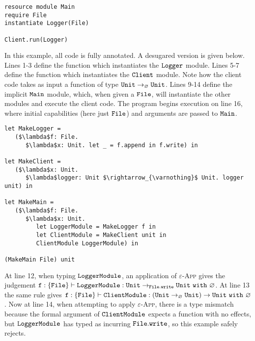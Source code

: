 \begin{lstlisting}
resource module Main
require File
instantiate Logger(File)

Client.run(Logger)
\end{lstlisting}

In this example, all code is fully annotated. A desugared version is given below. Lines 1-3 define the function which instantiates the $\mathtt{Logger}$ module. Lines 5-7 define the function which instantiates the $\mathtt{Client}$ module. Note how the client code takes as input a function of type $\mathtt{Unit} \rightarrow_{\varnothing} \mathtt{Unit}$. Lines 9-14 define the implicit $\mathtt{Main}$ module, which, when given a $\mathtt{File}$, will instantiate the other modules and execute the client code. The program begins execution on line 16, where initial capabilities (here just $\mathtt{File}$) and arguments are passed to $\mathtt{Main}$.

\begin{lstlisting}
let MakeLogger =
   ($\lambda$f: File.
      $\lambda$x: Unit. let _ = f.append in f.write) in
           
let MakeClient =
   ($\lambda$x: Unit.
      $\lambda$logger: Unit $\rightarrow_{\varnothing}$ Unit. logger unit) in
                  
let MakeMain =
   ($\lambda$f: File.
      $\lambda$x: Unit.
         let LoggerModule = MakeLogger f in
         let ClientModule = MakeClient unit in
         ClientModule LoggerModule) in

(MakeMain File) unit
\end{lstlisting}

At line 12, when typing $\mathtt{LoggerModule}$, an application of \textsc{$\varepsilon$-App} gives the judgement $\mathtt{ f: \{ File \} \vdash LoggerModule: Unit \rightarrow_{\mathtt{File.write}} Unit~\mathtt{with}~ \varnothing}$. At line 13 the same rule gives $\mathtt{ f: \{ File \} \vdash ClientModule: (Unit \rightarrow_{\varnothing} Unit) \rightarrow Unit~\mathtt{with}~ \varnothing}$. Now at line 14, when attempting to apply \textsc{$\varepsilon$-App}, there is a type mismatch because the formal argument of $\mathtt{ClientModule}$ expects a function with no effects, but $\mathtt{LoggerModule}$ has typed as incurring $\mathtt{File.write}$, so this example safely rejects.









































